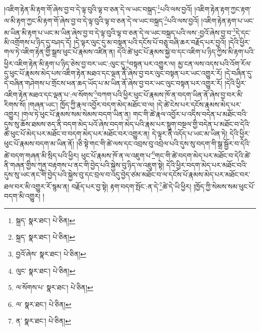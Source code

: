 །འཇིག་རྟེན་མི་རྟག་གོ་ཞེས་བྱ་བ་དེ་ལྟ་བུའི་ལྟ་བ་ཅན་དེ་ལ་ཡང་བསྐྲད་\footnote{སྐྲད་  སྣར་ཐང་།  པེ་ཅིན། }པའི་ལས་བྱའོ། །འཇིག་རྟེན་རྟག་ཀྱང་རྟག་ལ་མི་རྟག་ཀྱང་མི་རྟག་གོ་ཞེས་བྱ་བ་དེ་ལྟ་བུའི་ལྟ་བ་ཅན་དེ་ལ་ཡང་བསྐྲད་\footnote{སྐྲད་  སྣར་ཐང་།  པེ་ཅིན། }པའི་ལས་བྱའོ། །འཇིག་རྟེན་རྟག་པ་ཡང་མ་ཡིན་མི་རྟག་པ་ཡང་མ་ཡིན་ཞེས་བྱ་བ་དེ་ལྟ་བུའི་ལྟ་བ་ཅན་དེ་ལ་ཡང་བསྐྲད་པའི་ལས་:བྱའོ་ཞེས་བྱ་བ་\footnote{བྱའོ་ཞེས་  སྣར་ཐང་།  པེ་ཅིན། }དེ་དང་མི་འགྲོགས་པ་ཉིད་དུ་བཤད་དོ། །དེ་ལྟར་ལུང་དུ་མ་བསྟན་པའི་དངོས་པོ་བཅུ་བཞི་ཆར་བརྗོད་པར་བྱའོ། །དེའི་ཕྱིར་གལ་ཏེ་འཇིག་རྟེན་གྱི་སྒྲས་ཕུང་པོ་རྣམས་འཛིན་ན། དེའི་ཚེ་ཕུང་པོ་རྣམས་སྐྱེ་བ་དང་འཇིག་པ་ཉིད་ཀྱིས་མི་རྟག་པའི་ཕྱིར་འཇིག་རྟེན་མི་རྟག་པ་ཉིད་ཅེས་བྱ་བར་ཡང་:ལུང་དུ་\footnote{ལུང་  སྣར་ཐང་།  པེ་ཅིན། }བསྟན་པར་འགྱུར་ལ། མྱ་ངན་ལས་འདས་པའི་འོག་རོལ་དུ་ཕུང་པོ་རྣམས་མེད་པས་འཇིག་རྟེན་མཐའ་དང་ལྡན་ནོ་ཞེས་བྱ་བར་ལུང་བསྟན་པར་ཡང་འགྱུར་རོ། །དེ་བཞིན་དུ་དེ་བཞིན་གཤེགས་པ་གྲོངས་ཕན་ཆད་ཡོད་པ་མ་ཡིན་ནོ་ཞེས་བྱ་བར་ཡང་ལུང་བསྟན་པར་འགྱུར་རོ། །དེའི་ཕྱིར་འཇིག་རྟེན་མཐའ་དང་ལྡན་པ་:ལ་སོགས་\footnote{ལ་སོགས་པ་  སྣར་ཐང་།  པེ་ཅིན། }བཀག་པའི་ཕྱིར་ཕུང་པོ་རྣམས་ཁོ་ན་བདག་ཡིན་ནོ་ཞེས་བྱ་བར་མི་རིགས་སོ། །གཞན་ཡང་། ཁྱོད་ཀྱི་རྣལ་འབྱོར་བདག་མེད་མཐོང་བ་ལ། །དེ་ཚེ་ངེས་པར་དངོས་རྣམས་མེད་པར་འགྱུར། །གལ་ཏེ་ཕུང་པོ་རྣམས་སམ་སེམས་བདག་ཡིན་ན། གང་གི་ཚེ་རྣལ་འབྱོར་པ་འདིས་བདེན་པ་མཐོང་བའི་དུས་སུ་ཆོས་ཐམས་ཅད་ནི་བདག་མེད་པའོ་ཞེས་བདག་མེད་པའི་རྣམ་པར་སྡུག་བསྔལ་གྱི་བདེན་པ་མཐོང་བ་དེའི་ཚེ་ཕུང་པོ་མེད་པར་མཐོང་བ་བདག་མེད་པར་མཐོང་བར་འགྱུར་ན། དེ་ལྟར་ནི་འདོད་པ་ཡང་མ་ཡིན་ཏེ། དེའི་ཕྱིར་ཕུང་པོ་རྣམས་བདག་མ་ཡིན་ནོ། །ཅི་སྟེ་གང་གི་ཚེ་ལས་དང་འབྲས་བུ་འབྲེལ་པའི་དུས་སུ་བདག་གི་སྒྲ་སྦྱོར་བ་དེའི་ཚེ་བདག་གཞན་མི་སྲིད་པའི་ཕྱིར། ཕུང་པོ་རྣམས་ཁོ་ན་ལ་འཇུག་པ་\footnote{ལ་  སྣར་ཐང་།  པེ་ཅིན། }གང་གི་ཚེ་བདག་མེད་པར་མཐོང་བ་དེའི་ཚེ་ནི་གཞན་གྱིས་ཀུན་བརྟགས་པ་ནང་གི་བྱེད་པའི་སྐྱེས་བུ་ཉིད་ལ་འཇུག་སྟེ། དེའི་ཕྱིར་བདག་མེད་པར་མཐོང་བའི་དུས་སུ་ཡང་ནང་གི་བྱེད་པའི་སྐྱེས་བུ་དང་བྲལ་བ་འདུ་བྱེད་ཙམ་མཐོང་བ་ལ་དངོས་པོ་རྣམས་མེད་པར་མཐོང་བར་ཐལ་བར་མི་འགྱུར་རོ་སྙམ་ན། བརྗོད་པར་བྱ་སྟེ། རྟག་བདག་སྤོང་:ན་དེ་\footnote{ན་  སྣར་ཐང་།  པེ་ཅིན། }ཚེ་དེ་ཡི་ཕྱིར། །ཁྱོད་ཀྱི་སེམས་སམ་ཕུང་པོ་བདག་མི་འགྱུར། །

